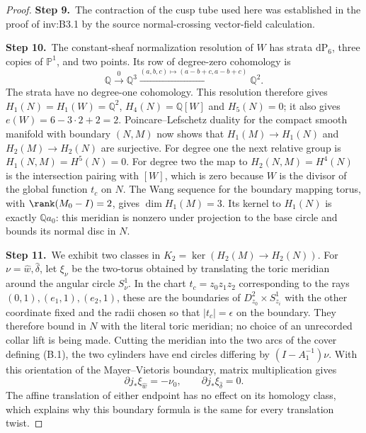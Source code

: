 \begin{proof}
\par\smallskip\noindent\textbf{Step 9.}\ The contraction of the cusp tube used here was established in the proof of inv:B3.1 by the source normal-crossing vector-field calculation.

\par\smallskip\noindent\textbf{Step 10.}\ The constant-sheaf normalization resolution of $W$ has strata
$\mathrm{dP}_6$, three copies of $\mathbb P^1$, and two points.
Its row of degree-zero cohomology is
\[
 \mathbb Q\xrightarrow{0}\mathbb Q^3
 \xrightarrow{(a,b,c)\mapsto(a-b+c,a-b+c)}\mathbb Q^2.
\]
The strata have no degree-one cohomology. This resolution therefore
gives $H_1(N)=H_1(W)=\mathbb Q^2$, $H_4(N)=\mathbb Q[W]$ and $H_5(N)=0$;
it also gives $e(W)=6-3\cdot2+2=2$.
Poincare--Lefschetz duality for the compact smooth manifold with
boundary $(N,M)$ now shows that $H_1(M)\to H_1(N)$ and
$H_2(M)\to H_2(N)$ are surjective. For degree one the next
relative group is $H_1(N,M)=H^5(N)=0$.
For degree two the map to $H_2(N,M)=H^4(N)$ is the intersection
pairing with $[W]$, which is zero because $W$ is the divisor of
the global function $t_c$ on $N$. The Wang sequence for the
boundary mapping torus, with $\rank(M_0-I)=2$, gives
$\dim H_1(M)=3$. Its kernel to $H_1(N)$ is exactly
$\mathbb Q a_0$: this meridian is nonzero under projection to the base
circle and bounds its normal disc in $N$.

\par\smallskip\noindent\textbf{Step 11.}\ We exhibit two classes in
$K_2=\ker(H_2(M)\to H_2(N))$.
For $\nu=\hat w,\hat\delta$, let $\xi_\nu$ be the two-torus
obtained by translating the toric meridian around the angular
circle $S^1_\nu$. In the chart $t_c=z_0z_1z_2$ corresponding to
the rays $(0,1),(e_1,1),(e_2,1)$, these are the boundaries of
$D^2_{z_0}\times S^1_{z_i}$ with the other coordinate fixed
and the radii chosen so that $|t_c|=\epsilon$ on the boundary.
They therefore bound in $N$ with the literal toric meridian;
no choice of an unrecorded collar lift is being made.
Cutting the meridian into the two arcs of the cover defining
(B.1), the two cylinders have end circles differing by
$(I-A_1^{-1})\nu$. With this orientation of the Mayer--Vietoris
boundary, matrix multiplication gives
\[
 \partial j_*\xi_{\hat w}=-\nu_0,\qquad
 \partial j_*\xi_{\hat\delta}=0.                       \tag{B.3}
\]
The affine translation of either endpoint has no effect on its
homology class, which explains why this boundary formula is the
same for every translation twist.


\end{proof}
